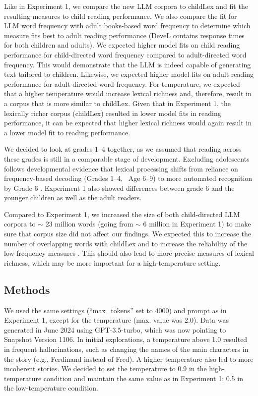 \documentclass[manuscript]{stjour}
\begin{document}
Like in Experiment 1, we compare the new LLM corpora to childLex \citep{schroeder_childlex_2015} and fit the resulting measures to child reading performance. We also compare the fit for LLM word frequency with adult books-based word frequency \citep[DWDS][]{heister_dlexdb_2011} to determine which measure fits best to adult reading performance (DeveL contains response times for both children and adults). We expected higher model fits on child reading performance for child-directed word frequency compared to adult-directed word frequency. This would demonstrate that the LLM is indeed capable of generating text tailored to children. Likewise, we expected higher model fits on adult reading performance for adult-directed word frequency. For temperature, we expected that a higher temperature would increase lexical richness and, therefore, result in a corpus that is more similar to childLex. Given that in Experiment 1, the lexically richer corpus (childLex) resulted in lower model fits in reading performance, it can be expected that higher lexical richness would again result in a lower model fit to reading performance.   

We decided to look at grades 1--4 together, as we assumed that reading across these grades is still in a comparable stage of development. Excluding adolescents follows developmental evidence that lexical processing shifts from reliance on frequency-based decoding (Grades 1--4, ~Age 6--9) to more automated recognition by Grade 6 \citep{meixner2022perceptual}. Experiment 1 also showed differences between grade 6 and the younger children as well as the adult readers. 

Compared to Experiment 1, we increased the size of both child-directed LLM corpora to $\sim$ 23 million words (going from $\sim$ 6 million in Experiment 1) to make sure that corpus size did not affect our findings. We expected this to increase the number of overlapping words with childLex and to increase the reliability of the low-frequency measures \citep{gernsbacher_resolving_1984}. This should also lead to more precise measures of lexical richness, which may be more important for a high-temperature setting. 


\subsection{Methods}

We used the same settings (“max\_tokens” set to 4000) and prompt as in Experiment 1, except for the temperature (max. value was 2.0). Data was generated in June 2024 using GPT-3.5-turbo, which was now pointing to Snapshot Version 1106. In initial explorations, a temperature above 1.0 resulted in frequent hallucinations, such as changing the names of the main characters in the story (e.g., Ferdinand instead of Fred). A higher temperature also led to more incoherent stories. We decided to set the temperature to 0.9 in the high-temperature condition and maintain the same value as in Experiment 1: 0.5 in the low-temperature condition. 
\end{document}
